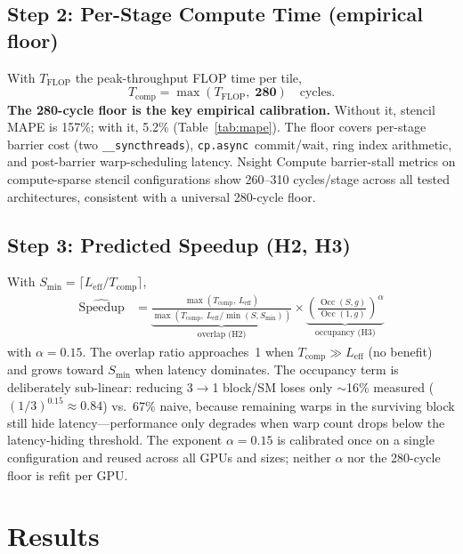 \documentclass[10pt,twocolumn]{article}
\newcommand{\cpasync}{\texttt{cp.async}}
\newcommand{\Leff}{L_{\text{eff}}}
\newcommand{\Tcomp}{T_{\text{comp}}}
\newcommand{\Smin}{S_{\min}}
\begin{document}
\subsection{Step 2: Per-Stage Compute Time (empirical floor)}

With $T_{\text{FLOP}}$ the peak-throughput FLOP time per tile,
\begin{equation}
  \Tcomp = \max(T_{\text{FLOP}},\; \mathbf{280})\quad\text{cycles}.
\end{equation}
\textbf{The 280-cycle floor is the key empirical calibration.}
Without it, stencil MAPE is 157\%; with it, 5.2\%
(Table~\ref{tab:mape}).  The floor covers per-stage barrier
cost (two \texttt{\_\_syncthreads}), \cpasync{}~commit/wait, ring
index arithmetic, and post-barrier warp-scheduling latency.  Nsight
Compute barrier-stall metrics on compute-sparse stencil
configurations show 260--310 cycles/stage across all tested
architectures, consistent with a universal 280-cycle floor.

\subsection{Step 3: Predicted Speedup (H2, H3)}

With $\Smin = \lceil \Leff / \Tcomp \rceil$,
\begin{align}
\widehat{\text{Speedup}} &=
  \underbrace{\tfrac{\max(\Tcomp,\, \Leff)}
                    {\max(\Tcomp,\, \Leff/\min(S,\Smin))}}_{
                    \text{overlap (H2)}}
  \times
  \underbrace{\!\!\left(\tfrac{\operatorname{Occ}(S,g)}{\operatorname{Occ}(1,g)}\right)^{\!\alpha}\!\!}_{
                    \text{occupancy (H3)}}
\label{eq:speedup}
\end{align}
with $\alpha = 0.15$.  The overlap ratio approaches~1 when
$\Tcomp \gg \Leff$ (no benefit) and grows toward $\Smin$ when
latency dominates.  The occupancy term is deliberately sub-linear:
reducing 3$\to$1 block/SM loses only $\sim$16\% measured
($(1/3)^{0.15}\!\approx\!0.84$) vs.\ 67\% naive, because remaining
warps in the surviving block still hide latency---performance only
degrades when warp count drops below the latency-hiding threshold.
The exponent $\alpha{=}0.15$ is calibrated once on a single
configuration and reused across all GPUs and sizes; neither $\alpha$
nor the 280-cycle floor is refit per GPU.

\section{Results}
\label{sec:results}
\end{document}
